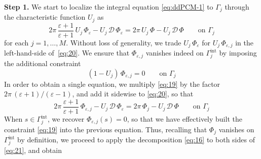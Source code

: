 {\bf Step 1.} 
We start to localize the integral equation \eqref{eq:ddPCM-1} to $\Gamma_j$ through the characteristic function $U_j$ as
\begin{equation}\label{eq:20}
2 \pi \, \frac{\varepsilon + 1}{\varepsilon + 1} \, U_j \, \Phi_{\varepsilon} - U_j \, {\mathcal{D} \, \Phi}_\varepsilon = 2 \pi \, U_j \, \Phi - U_j \, {\mathcal{D} \, \Phi} \qquad \text{on }\Gamma_j
\end{equation}
for each $j=1,\ldots,M$. 
Without loss of generality, we trade $U_j \, \Phi_\varepsilon$ for $U_j \, \Phi_{\varepsilon,j}$ in the left-hand-side of~\eqref{eq:20}.
We ensure that $\Phi_{\varepsilon,j}$ vanishes indeed on $\Gamma_j^\text{int}$ by imposing the additional constraint
\begin{equation}\label{eq:19}
(1 - U_j) \, \Phi_{\varepsilon,j}  = 0\qquad \text{on }\Gamma_j 
\end{equation}
In order to obtain a single equation, we multiply \eqref{eq:19} by the factor $2\pi \, (\varepsilon+1)/(\varepsilon-1)$, and add it sidewise to \eqref{eq:20}, so that 
\begin{equation}\label{eq:21}
2 \pi \, \frac{\varepsilon + 1}{\varepsilon + 1} \, \Phi_{\varepsilon,j} - U_j \, {\mathcal{D} \, \Phi}_\varepsilon = 2 \pi \, \Phi_j - U_j \, {\mathcal{D} \, \Phi} \qquad \text{on }\Gamma_j
\end{equation}
When $s \in \Gamma_j^\text{int}$, we recover $\Phi_{\varepsilon,j}(s) = 0$, so that we have effectively built the constraint \eqref{eq:19} into the previous equation. Thus, recalling that $\Phi_j$ vanishes on $\Gamma_j^\text{int}$ by definition, we proceed to apply the decomposition \eqref{eq:16} to both sides of \eqref{eq:21}, and obtain
